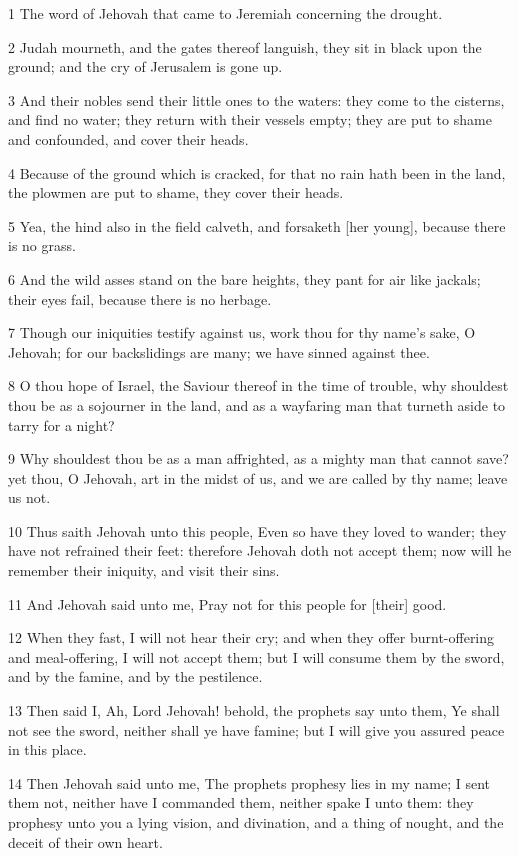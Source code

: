 \par 1 The word of Jehovah that came to Jeremiah concerning the drought.
\par 2 Judah mourneth, and the gates thereof languish, they sit in black upon the ground; and the cry of Jerusalem is gone up.
\par 3 And their nobles send their little ones to the waters: they come to the cisterns, and find no water; they return with their vessels empty; they are put to shame and confounded, and cover their heads.
\par 4 Because of the ground which is cracked, for that no rain hath been in the land, the plowmen are put to shame, they cover their heads.
\par 5 Yea, the hind also in the field calveth, and forsaketh [her young], because there is no grass.
\par 6 And the wild asses stand on the bare heights, they pant for air like jackals; their eyes fail, because there is no herbage.
\par 7 Though our iniquities testify against us, work thou for thy name's sake, O Jehovah; for our backslidings are many; we have sinned against thee.
\par 8 O thou hope of Israel, the Saviour thereof in the time of trouble, why shouldest thou be as a sojourner in the land, and as a wayfaring man that turneth aside to tarry for a night?
\par 9 Why shouldest thou be as a man affrighted, as a mighty man that cannot save? yet thou, O Jehovah, art in the midst of us, and we are called by thy name; leave us not.
\par 10 Thus saith Jehovah unto this people, Even so have they loved to wander; they have not refrained their feet: therefore Jehovah doth not accept them; now will he remember their iniquity, and visit their sins.
\par 11 And Jehovah said unto me, Pray not for this people for [their] good.
\par 12 When they fast, I will not hear their cry; and when they offer burnt-offering and meal-offering, I will not accept them; but I will consume them by the sword, and by the famine, and by the pestilence.
\par 13 Then said I, Ah, Lord Jehovah! behold, the prophets say unto them, Ye shall not see the sword, neither shall ye have famine; but I will give you assured peace in this place.
\par 14 Then Jehovah said unto me, The prophets prophesy lies in my name; I sent them not, neither have I commanded them, neither spake I unto them: they prophesy unto you a lying vision, and divination, and a thing of nought, and the deceit of their own heart.
